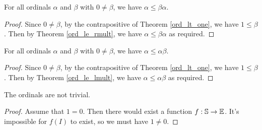 \documentclass[../../math.tex]{subfiles}
\begin{document}
\begin{theorem} \label{ord_le_self_lmult}
    For all ordinals $\alpha$ and $\beta$ with $0 \neq \beta$, we have $\alpha
    \leq \beta \alpha$.
\end{theorem}
\begin{proof}
    Since $0 \neq \beta$, by the contrapositive of Theorem \ref{ord_lt_one}, we
    have $1 \leq \beta$.  Then by Theorem \ref{ord_le_rmult}, we have $\alpha
    \leq \beta \alpha$ as required.
\end{proof}

\begin{theorem} \label{ord_le_self_rmult}
    For all ordinals $\alpha$ and $\beta$ with $0 \neq \beta$, we have $\alpha
    \leq \alpha \beta$.
\end{theorem}
\begin{proof}
    Since $0 \neq \beta$, by the contrapositive of Theorem \ref{ord_lt_one}, we
    have $1 \leq \beta$.  Then by Theorem \ref{ord_le_lmult}, we have $\alpha
    \leq \alpha \beta$ as required.
\end{proof}

\begin{instance}
    The ordinals are not trivial.
\end{instance}
\begin{proof}
    Assume that $1 = 0$.  Then there would exist a function $f : \mathbb{S} \to \mathbb{E}$.
    It's impossible for $f(I)$ to exist, so we must have $1 \neq 0$.
\end{proof}
\end{document}
